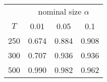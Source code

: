 % 
\begin{tabular}{cccc}
  \hline
  & \multicolumn{3}{c}{nominal size $\alpha$} \\
 $T$ & 0.01 & 0.05 & 0.1 \\
 \hline
250 & 0.674 & 0.884 & 0.908 \\ 
  300 & 0.707 & 0.936 & 0.936 \\ 
  500 & 0.990 & 0.982 & 0.962 \\ 
   \hline
\end{tabular}
